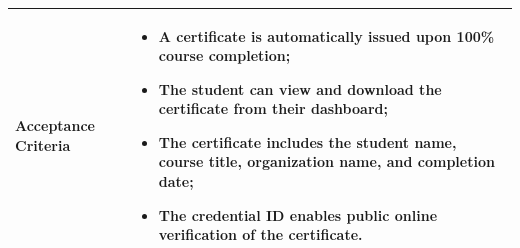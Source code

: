 \begin{table}[H]
\begin{tabularx}{\textwidth}{|p{3.5cm}|X|}
\hline
\textbf{Acceptance Criteria} &
\begin{itemize}[noitemsep, topsep=2pt]
  \item A certificate is automatically issued upon 100\% course completion;
  \item The student can view and download the certificate from their dashboard;
  \item The certificate includes the student name, course title, organization name, and completion date;
  \item The credential ID enables public online verification of the certificate.
\end{itemize} \\
\hline
\end{tabularx}
\end{table}

